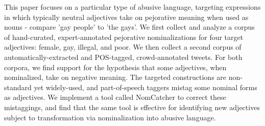 This paper focuses on a particular type of abusive language, targeting expressions in which typically neutral adjectives take on pejorative meaning when used as nouns - compare 'gay people' to 'the gays'. We first collect and analyze a corpus of hand-curated, expert-annotated pejorative nominalizations for four target adjectives: female, gay, illegal, and poor. We then collect a second corpus of automatically-extracted and POS-tagged, crowd-annotated tweets. For both corpora, we find support for the hypothesis that some adjectives, when nominalized, take on negative meaning. The targeted constructions are non-standard yet widely-used, and part-of-speech taggers mistag some nominal forms as adjectives. We implement a tool called NomCatcher to correct these mistaggings, and find that the same tool is effective for identifying new adjectives subject to transformation via nominalization into abusive language.
